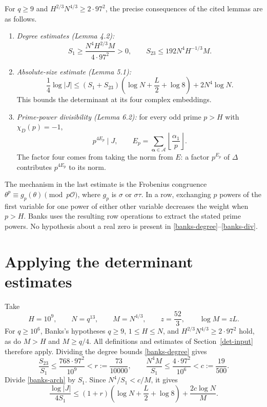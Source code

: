 \documentclass[11pt]{article}
\begin{document}
For \(q\ge9\) and \(H^{2/3}N^{4/3}\ge2\cdot97^2\), the precise
consequences of the cited lemmas are as follows.
\begin{enumerate}
\item \emph{Degree estimates (Lemma 4.2):}
\begin{equation}\label{banks-degree}
 S_1\ge\frac{N^4H^{2/3}M}{4\cdot97^2}>0,
 \qquad
 S_{23}\le192N^4H^{-1/3}M.
\end{equation}
\item \emph{Absolute-size estimate (Lemma 5.1):}
\begin{equation}\label{banks-arch}
 \frac14\log|J|
 \le (S_1+S_{23})\left(\log N+\frac L2+\log8\right)
                       +2N^4\log N.
\end{equation}
This bounds the determinant at its four complex embeddings.
\item \emph{Prime-power divisibility (Lemma 6.2):}
for every odd prime \(p>H\) with \(\chi_D(p)=-1\),
\begin{equation}\label{banks-div}
 p^{4E_p}\mid J,\qquad
 E_p=\sum_{\boldsymbol\alpha\in\mathcal A}
           \left\lfloor\frac{\alpha_1}{p}\right\rfloor.
\end{equation}
The factor four comes from taking the norm from \(E\): a factor
\(p^{E_p}\) of \(\Delta\) contributes \(p^{4E_p}\) to its norm.
\end{enumerate}

The mechanism in the last estimate is the Frobenius congruence
\(\theta^p\equiv g_p(\theta)\pmod{p\mathcal O}\), where \(g_p\)
is \(\sigma\) or \(\sigma\tau\). In a row, exchanging \(p\) powers
of the first variable for one power of either other variable decreases
the weight when \(p>H\). Banks uses the resulting row operations to
extract the stated prime powers. No hypothesis about a real zero is
present in \eqref{banks-degree}--\eqref{banks-div}.

\section{Applying the determinant estimates}\label{comparison}

Take
\[
 H=10^9,\qquad N=q^{13},\qquad M=N^{4/3},\qquad
 z=\frac{52}{3},\qquad \log M=zL.
\]
For \(q\ge10^6\), Banks's hypotheses
\(q\ge9\), \(1\le H\le N\), and
\(H^{2/3}N^{4/3}\ge2\cdot97^2\) hold, as do \(M>H\) and \(M\ge q/4\).
All definitions and estimates of Section~\ref{det-input} therefore apply.
Dividing the degree bounds \eqref{banks-degree} gives
\[
 \frac{S_{23}}{S_1}\le\frac{768\cdot97^2}{10^9}
                  <r:=\frac{73}{10000},\qquad
 \frac{N^4M}{S_1}\le\frac{4\cdot97^2}{10^6}
                  <c:=\frac{19}{500}.
\]
Divide \eqref{banks-arch} by \(S_1\).
Since \(N^4/S_1<c/M\), it gives
\begin{equation}\label{arch}
 \frac{\log|J|}{4S_1}
 \le(1+r)\left(\log N+\frac L2+\log8\right)
                         +\frac{2c\log N}{M}.
\end{equation}
\end{document}
